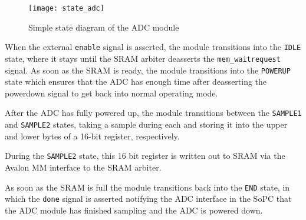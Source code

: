 \begin{figure}[h!]
\begin{center}
\texttt{[image: state\_adc]}
\caption{Simple state diagram of the ADC module}
\label{figure:state_adc}
\end{center}
\end{figure}

When the external \texttt{enable} signal is asserted, the module transitions into the
\texttt{IDLE} state, where it stays until the SRAM arbiter deasserts the \texttt{mem\_waitrequest}
signal. As soon as the SRAM is ready, the module transitions into the \texttt{POWERUP} state
which ensures that the ADC has enough time after deasserting the powerdown signal to
get back into normal operating mode.

After the ADC has fully powered up, the module transitions between the \texttt{SAMPLE1} and
\texttt{SAMPLE2} states, taking a sample during each and storing it into the upper and lower
bytes of a 16-bit register, respectively.

During the \texttt{SAMPLE2} state, this 16 bit register is written out to SRAM via the
Avalon MM interface to the SRAM arbiter.

As soon as the SRAM is full the module transitions back into the \texttt{END} state, in which
the \texttt{done} signal is asserted notifying the ADC interface in the SoPC that the ADC
module has finished sampling and the ADC is powered down.



